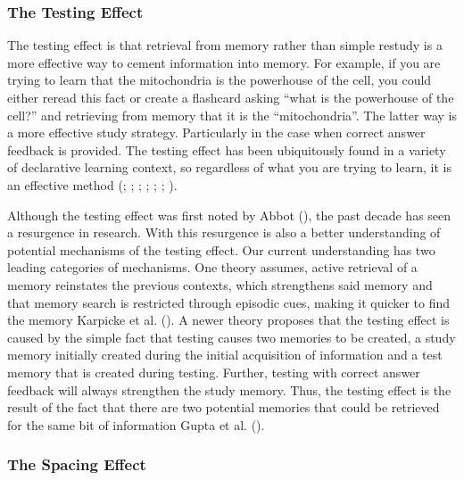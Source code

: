 \documentclass[
]{krantz}
\begin{document}
\subsubsection*{The Testing Effect}\label{the-testing-effect}


The testing effect is that retrieval from memory rather than simple restudy is a more effective way to cement information into memory. For example, if you are trying to learn that the mitochondria is the powerhouse of the cell, you could either reread this fact or create a flashcard asking ``what is the powerhouse of the cell?'' and retrieving from memory that it is the ``mitochondria''. The latter way is a more effective study strategy. Particularly in the case when correct answer feedback is provided. The testing effect has been ubiquitously found in a variety of declarative learning context, so regardless of what you are trying to learn, it is an effective method (; ; ; ; ; ; ).

Although the testing effect was first noted by Abbot (), the past decade has seen a resurgence in research. With this resurgence is also a better understanding of potential mechanisms of the testing effect. Our current understanding has two leading categories of mechanisms. One theory assumes, active retrieval of a memory reinstates the previous contexts, which strengthens said memory and that memory search is restricted through episodic cues, making it quicker to find the memory Karpicke et al. (). A newer theory proposes that the testing effect is caused by the simple fact that testing causes two memories to be created, a study memory initially created during the initial acquisition of information and a test memory that is created during testing. Further, testing with correct answer feedback will always strengthen the study memory. Thus, the testing effect is the result of the fact that there are two potential memories that could be retrieved for the same bit of information Gupta et al. ().

\subsubsection*{The Spacing Effect}\label{the-spacing-effect}
\end{document}
